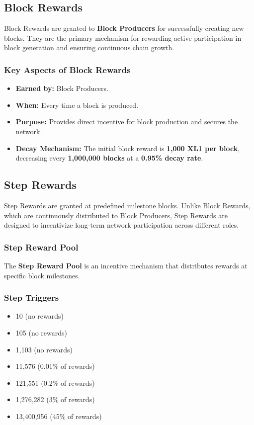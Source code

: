 \documentclass{article}
\begin{document}
\subsection{Block Rewards}

Block Rewards are granted to \textbf{Block Producers} for successfully creating
new blocks. They are the primary mechanism for rewarding active participation
in block generation and ensuring continuous chain growth.

\subsubsection{Key Aspects of Block Rewards}
\begin{itemize}
    \item \textbf{Earned by:} Block Producers.
    \item \textbf{When:} Every time a block is produced.
    \item \textbf{Purpose:} Provides direct incentive for block production and secures the network.
    \item \textbf{Decay Mechanism:} The initial block reward is \textbf{1,000 XL1 per block}, decreasing every \textbf{1,000,000 blocks} at a \textbf{0.95\% decay rate}.
\end{itemize}

\subsection{Step Rewards}

Step Rewards are granted at predefined milestone blocks. Unlike Block Rewards,
which are continuously distributed to Block Producers, Step Rewards are
designed to incentivize long-term network participation across different roles.

\subsubsection{Step Reward Pool}

The \textbf{Step Reward Pool} is an incentive mechanism that distributes
rewards at specific block milestones.

\subsubsection{Step Triggers}
\begin{itemize}
    \item 10 (no rewards)
    \item 105 (no rewards)
    \item 1,103 (no rewards)
    \item 11,576 (0.01\% of rewards)
    \item 121,551 (0.2\% of rewards)
    \item 1,276,282 (3\% of rewards)
    \item 13,400,956 (45\% of rewards)
\end{itemize}
\end{document}
